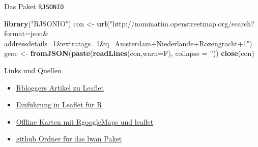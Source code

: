 \documentclass[ignorenonframetext,]{beamer}
\newenvironment{Shaded}{\begin{snugshade}}{\end{snugshade}}
\newcommand{\KeywordTok}[1]{\textcolor[rgb]{0.13,0.29,0.53}{\textbf{#1}}}
\newcommand{\DataTypeTok}[1]{\textcolor[rgb]{0.13,0.29,0.53}{#1}}
\newcommand{\StringTok}[1]{\textcolor[rgb]{0.31,0.60,0.02}{#1}}
\newcommand{\NormalTok}[1]{#1}
\begin{document}
\begin{frame}[fragile]{Das Paket \texttt{RJSONIO}}

\begin{Shaded}
\begin{Highlighting}[]
\KeywordTok{library}\NormalTok{(}\StringTok{"RJSONIO"}\NormalTok{)}
\NormalTok{con <-}\StringTok{ }\KeywordTok{url}\NormalTok{(}\StringTok{"http://nominatim.openstreetmap.org/search?format=json&}
\StringTok{addressdetails=1&extratags=1&q=Amsterdam+Niederlande+Rozengracht+1"}\NormalTok{)}
\NormalTok{geoc <-}\StringTok{ }\KeywordTok{fromJSON}\NormalTok{(}\KeywordTok{paste}\NormalTok{(}\KeywordTok{readLines}\NormalTok{(con,}\DataTypeTok{warn=}\NormalTok{F), }
                       \DataTypeTok{collapse =} \StringTok{''}\NormalTok{))}
\KeywordTok{close}\NormalTok{(con)}
\end{Highlighting}
\end{Shaded}

\end{frame}

\begin{frame}{Links und Quellen}

\begin{itemize}
\item
  \href{http://www.r-bloggers.com/the-leaflet-package-for-online-mapping-in-r/}{Rbloggers
  Artikel zu Leaflet}
\item
  \href{https://rstudio.github.io/leaflet/}{Einführung in Leaflet für R}
\item
  \href{https://blog.hwr-berlin.de/codeandstats/category/scientific-software/r/}{Offline
  Karten mit RgoogleMaps und leaflet}
\item
  \href{https://github.com/ropensci/lawn}{github Ordner für das lwan
  Paket}
\end{itemize}

\end{frame}
\end{document}
